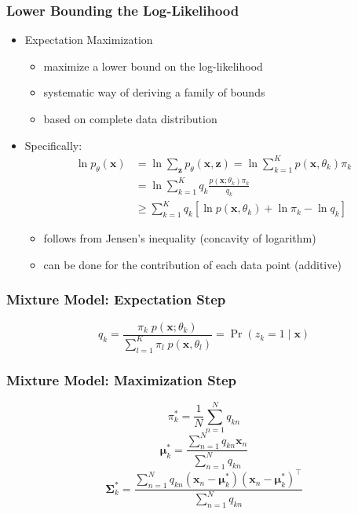 \documentclass[11pt,a4paper,technote]{IEEEtran}
\newcommand{\matr}[1]{\boldsymbol{\mathbf{#1}}}
\newcommand{\vect}[1]{\boldsymbol{\mathbf{#1}}}
\newcommand{\trns}[1]{#1^{\top}}
\begin{document}
\subsubsection*{Lower Bounding the Log-Likelihood}
\begin{itemize}
  \item Expectation Maximization
    \begin{itemize}
      \item maximize a lower bound on the log-likelihood
      \item systematic way of deriving a family of bounds
      \item based on complete data distribution
    \end{itemize}
  \item Specifically:
    \begin{align*}
      \ln p_{\theta}(\vect{x}) &= \ln \sum_{\vect{z}} p_{\theta}(\vect{x},
      \vect{z}) = \ln \sum_{k=1}^K p(\vect{x}, \theta_k) \pi_k \\
      &= \ln \sum_{k=1}^K q_k \frac{p(\vect{x}; \theta_k) \pi_k}{q_k} \\
      &\geq \sum_{k=1}^K q_k \left[\ln p(\vect{x},\theta_k)+\ln\pi_k-\ln q_k \right]
    \end{align*}
    \begin{itemize}
      \item follows from Jensen's inequality (concavity of logarithm)
      \item can be done for the contribution of each data point (additive)
    \end{itemize}
\end{itemize}

\subsubsection*{Mixture Model: Expectation Step}
\[
  q_k = \frac{\pi_k\; p(\vect{x}; \theta_k)}{\sum_{l=1}^K \pi_l\;p(\vect{x}, \theta_l)}
  = \Pr(z_k = 1 \mid \vect{x})
\]

\subsubsection*{Mixture Model: Maximization Step}
\[ \pi_k^* = \frac{1}{N} \sum_{n=1}^N q_{kn} \]
\[ \vect{\mu}_k^* = \frac{\sum_{n=1}^N q_{kn}\vect{x}_n}{\sum_{n=1}^N q_{kn}} \]
\[
  \matr{\Sigma}_k^* = \frac{\sum_{n=1}^N q_{kn}(\vect{x}_n -
    \vect{\mu}_k^*)\trns{(\vect{x}_n - \vect{\mu}_k^*)}}{\sum_{n=1}^N q_{kn}}
\]
\end{document}
